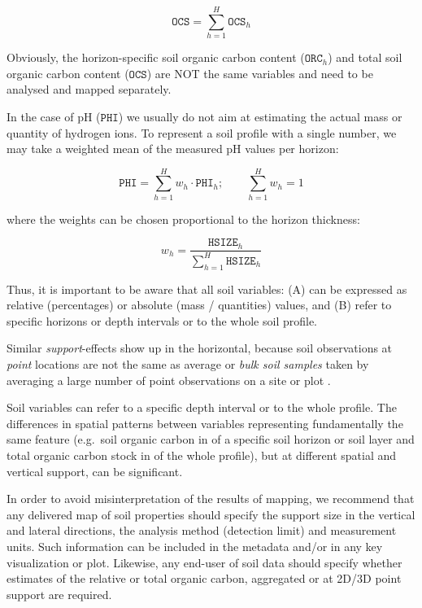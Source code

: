 \documentclass[11pt]{krantz}
\makeatletter
\newenvironment{kframe}{%
\medskip{}
\setlength{\fboxsep}{.8em}
 \def\at@end@of@kframe{}%
 \ifinner\ifhmode%
  \def\at@end@of@kframe{\end{minipage}}%
  \begin{minipage}{\columnwidth}%
 \fi\fi%
 \def\FrameCommand##1{\hskip\@totalleftmargin \hskip-\fboxsep
 \colorbox{shadecolor}{##1}\hskip-\fboxsep
     \hskip-\linewidth \hskip-\@totalleftmargin \hskip\columnwidth}%
 \MakeFramed {\advance\hsize-\width
   \@totalleftmargin\z@ \linewidth\hsize
   \@setminipage}}%
 {\par\unskip\endMakeFramed%
 \at@end@of@kframe}
\newenvironment{rmdblock}[1]
  {
  \begin{itemize}
  \renewcommand{\labelitemi}{
    \raisebox{-.7\height}[0pt][0pt]{
      {\setkeys{Gin}{width=3em,keepaspectratio}\texttt{[image: images/\#1]}}
    }
  }
  \setlength{\fboxsep}{1em}
  \begin{kframe}
  \item
  }
  {
  \end{kframe}
  \end{itemize}
  }
\newenvironment{rmdnote}
  {\begin{rmdblock}{note}}
  {\end{rmdblock}}
\theoremstyle{definition}
\theoremstyle{definition}
\theoremstyle{definition}
\theoremstyle{remark}
\makeatother
\begin{document}
\begin{equation}
\mathtt{OCS} = \sum\limits_{h = 1}^H { \mathtt{OCS}_h }
\label{eq:ORGCsum}
\end{equation}

Obviously, the horizon-specific soil organic carbon content
(\(\mathtt{ORC}_h\)) and total soil organic carbon content
(\(\mathtt{OCS}\)) are NOT the same variables and need to be analysed
and mapped separately.

In the case of pH (\(\mathtt{PHI}\)) we usually do not aim at estimating
the actual mass or quantity of hydrogen ions. To represent a soil
profile with a single number, we may take a weighted mean of the
measured pH values per horizon:

\begin{equation}
\mathtt{PHI} = \sum\limits_{h = 1}^H { w_h \cdot \mathtt{PHI}_h }; \qquad \sum\limits_{h = 1}^H{w_h} = 1
\label{eq:pHmean}
\end{equation}

where the weights can be chosen proportional to the horizon thickness:

\begin{equation}
w _h  = \frac{{\mathtt{HSIZE}_h}}{\sum\limits_{h = 1}^H {{\mathtt{HSIZE}}_h}}
\end{equation}

Thus, it is important to be aware that all soil variables: (A) can be
expressed as relative (percentages) or absolute (mass / quantities)
values, and (B) refer to specific horizons or depth intervals or to the
whole soil profile.

Similar \emph{support}-effects show up in the horizontal, because soil
observations at \emph{point} locations are not the same as average or
\emph{bulk soil samples} taken by averaging a large number of point
observations on a site or plot \citep{Webster2001Wiley}.

\begin{rmdnote}
Soil variables can refer to a specific depth interval or to the whole
profile. The differences in spatial patterns between variables
representing fundamentally the same feature (e.g.~soil organic carbon in
of a specific soil horizon or soil layer and total organic carbon stock
in of the whole profile), but at different spatial and vertical support,
can be significant.
\end{rmdnote}

In order to avoid misinterpretation of the results of mapping, we
recommend that any delivered map of soil properties should specify the
support size in the vertical and lateral directions, the analysis method
(detection limit) and measurement units. Such information can be
included in the metadata and/or in any key visualization or plot.
Likewise, any end-user of soil data should specify whether estimates of
the relative or total organic carbon, aggregated or at 2D/3D point
support are required.
\end{document}
